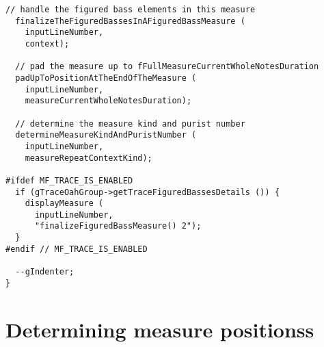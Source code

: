 \begin{lstlisting}[language=CPlusPlus]
  // handle the figured bass elements in this measure
  finalizeTheFiguredBassesInAFiguredBassMeasure (
    inputLineNumber,
    context);

  // pad the measure up to fFullMeasureCurrentWholeNotesDuration
  padUpToPositionAtTheEndOfTheMeasure (
    inputLineNumber,
    measureCurrentWholeNotesDuration);

  // determine the measure kind and purist number
  determineMeasureKindAndPuristNumber (
    inputLineNumber,
    measureRepeatContextKind);

#ifdef MF_TRACE_IS_ENABLED
  if (gTraceOahGroup->getTraceFiguredBassesDetails ()) {
    displayMeasure (
      inputLineNumber,
      "finalizeFiguredBassMeasure() 2");
  }
#endif // MF_TRACE_IS_ENABLED

  --gIndenter;
}
\end{lstlisting}


\section{Determining measure positionss}

